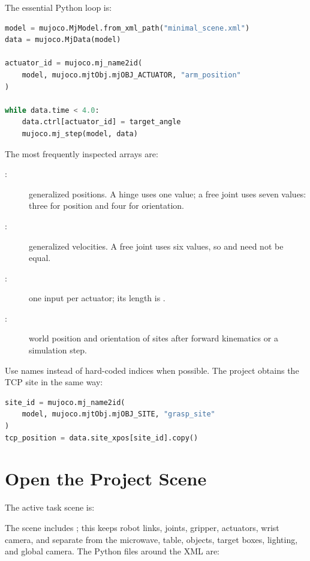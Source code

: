 The essential Python loop is:

\begin{lstlisting}[language=Python]
model = mujoco.MjModel.from_xml_path("minimal_scene.xml")
data = mujoco.MjData(model)

actuator_id = mujoco.mj_name2id(
    model, mujoco.mjtObj.mjOBJ_ACTUATOR, "arm_position"
)

while data.time < 4.0:
    data.ctrl[actuator_id] = target_angle
    mujoco.mj_step(model, data)
\end{lstlisting}

The most frequently inspected arrays are:

\begin{description}
  \item[:] generalized positions. A hinge uses one value;
  a free joint uses seven values: three for position and four for orientation.
  \item[:] generalized velocities. A free joint uses six
  values, so  and  need not be equal.
  \item[:] one input per actuator; its length is
  .
  \item[:] world position and orientation of
  sites after forward kinematics or a simulation step.
\end{description}

Use names instead of hard-coded indices when possible. The project obtains the
TCP site in the same way:

\begin{lstlisting}[language=Python]
site_id = mujoco.mj_name2id(
    model, mujoco.mjtObj.mjOBJ_SITE, "grasp_site"
)
tcp_position = data.site_xpos[site_id].copy()
\end{lstlisting}

\section{Open the Project Scene}
\label{sec:mujoco-scene}

The active task scene is:

\begin{center}
\end{center}

The scene includes ; this keeps robot links,
joints, gripper, actuators, wrist camera, and  separate
from the microwave, table, objects, target boxes, lighting, and global camera.
The Python files around the XML are:

